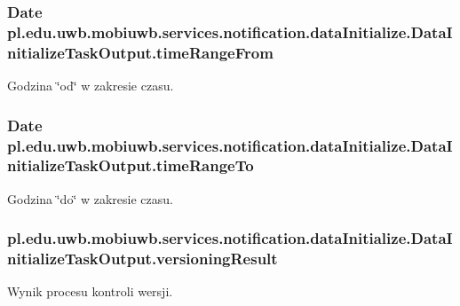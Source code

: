 \subsubsection[{time\+Range\+From}]{\setlength{\rightskip}{0pt plus 5cm}Date pl.\+edu.\+uwb.\+mobiuwb.\+services.\+notification.\+data\+Initialize.\+Data\+Initialize\+Task\+Output.\+time\+Range\+From}\label{classpl_1_1edu_1_1uwb_1_1mobiuwb_1_1services_1_1notification_1_1data_initialize_1_1_data_initialize_task_output_adcd4c45b687e9e888188b44c71719cf0}
Godzina \char`\"{}od\char`\"{} w zakresie czasu. \hypertarget{classpl_1_1edu_1_1uwb_1_1mobiuwb_1_1services_1_1notification_1_1data_initialize_1_1_data_initialize_task_output_a068f2b3350c944d6e7dd556d36c003c8}{}
\subsubsection[{time\+Range\+To}]{\setlength{\rightskip}{0pt plus 5cm}Date pl.\+edu.\+uwb.\+mobiuwb.\+services.\+notification.\+data\+Initialize.\+Data\+Initialize\+Task\+Output.\+time\+Range\+To}\label{classpl_1_1edu_1_1uwb_1_1mobiuwb_1_1services_1_1notification_1_1data_initialize_1_1_data_initialize_task_output_a068f2b3350c944d6e7dd556d36c003c8}
Godzina \char`\"{}do\char`\"{} w zakresie czasu. \hypertarget{classpl_1_1edu_1_1uwb_1_1mobiuwb_1_1services_1_1notification_1_1data_initialize_1_1_data_initialize_task_output_a21d66ed72b082c4dbfce68f4c2ae8b44}{}
\subsubsection[{versioning\+Result}]{ pl.\+edu.\+uwb.\+mobiuwb.\+services.\+notification.\+data\+Initialize.\+Data\+Initialize\+Task\+Output.\+versioning\+Result}\label{classpl_1_1edu_1_1uwb_1_1mobiuwb_1_1services_1_1notification_1_1data_initialize_1_1_data_initialize_task_output_a21d66ed72b082c4dbfce68f4c2ae8b44}
Wynik procesu kontroli wersji. 

